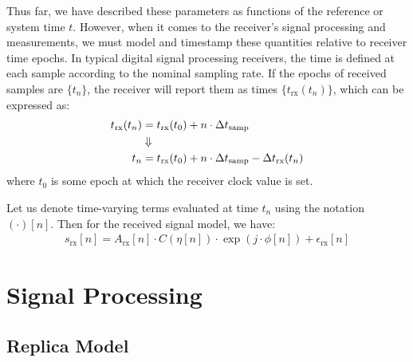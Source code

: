 \documentclass{article}
\begin{document}
Thus far, we have described these parameters as functions of the reference or system time $t$.  However, when it comes to the receiver's signal processing and measurements, we must model and timestamp these quantities relative to receiver time epochs.  In typical digital signal processing receivers, the time is defined at each sample according to the nominal sampling rate.  If the epochs of received samples are $\{t_n\}$, the receiver will report them as times $\{ t_\text{rx}(t_n)\}$, which can be expressed as:
%
\begin{align}
t_\text{rx}(t_n) &= t_\text{rx}(t_0) + n \cdot \Delta t_\text{samp}  \\
& \Downarrow \notag \\
t_n &= t_\text{rx}(t_0) + n\cdot\Delta t_\text{samp} - \Delta t_\text{rx}(t_n) 
\end{align}
%
where $t_0$ is some epoch at which the receiver clock value is set.

Let us denote time-varying terms evaluated at time $t_n$ using the notation $(\cdot)[n]$.  Then for the received signal model, we have:
%
\begin{align}
    s_\text{rx}[n] = A_\text{rx}[n] \cdot C(\eta[n]) \cdot \exp(j\cdot \phi[n]) + \epsilon_\text{rx}[n]
    \label{eqn:received-sampled-signal-model}
\end{align}


\section{Signal Processing}

\subsection{Replica Model}


\end{document}

